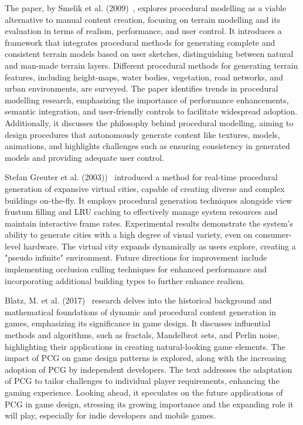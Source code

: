 \documentclass[runningheads]{llncs}
\begin{document}
The paper, by Smelik et al. (2009)~\cite{ref_article19}, explores procedural modelling as a viable alternative to manual content creation, focusing on terrain modelling and its evaluation in terms of realism, performance, and user control. It introduces a framework that integrates procedural methods for generating complete and consistent terrain models based on user sketches, distinguishing between natural and man-made terrain layers. Different procedural methods for generating terrain features, including height-maps, water bodies, vegetation, road networks, and urban environments, are surveyed. The paper identifies trends in procedural modelling research, emphasizing the importance of performance enhancements, semantic integration, and user-friendly controls to facilitate widespread adoption. Additionally, it discusses the philosophy behind procedural modelling, aiming to design procedures that autonomously generate content like textures, models, animations, and highlights challenges such as ensuring consistency in generated models and providing adequate user control.

Stefan Greuter et al. (2003))~\cite{ref_article20} introduced a method for real-time procedural generation of expansive virtual cities, capable of creating diverse and complex buildings on-the-fly. It employs procedural generation techniques alongside view frustum filling and LRU caching to effectively manage system resources and maintain interactive frame rates. Experimental results demonstrate the system's ability to generate cities with a high degree of visual variety, even on consumer-level hardware. The virtual city expands dynamically as users explore, creating a "pseudo infinite" environment. Future directions for improvement include implementing occlusion culling techniques for enhanced performance and incorporating additional building types to further enhance realism.

Blatz, M. et al. (2017)~\cite{ref_article7} research delves into the historical background and mathematical foundations of dynamic and procedural content generation in games, emphasizing its significance in game design. It discusses influential methods and algorithms, such as fractals, Mandelbrot sets, and Perlin noise, highlighting their applications in creating natural-looking game elements. The impact of PCG on game design patterns is explored, along with the increasing adoption of PCG by independent developers. The text addresses the adaptation of PCG to tailor challenges to individual player requirements, enhancing the gaming experience. Looking ahead, it speculates on the future applications of PCG in game design, stressing its growing importance and the expanding role it will play, especially for indie developers and mobile games.
\end{document}
